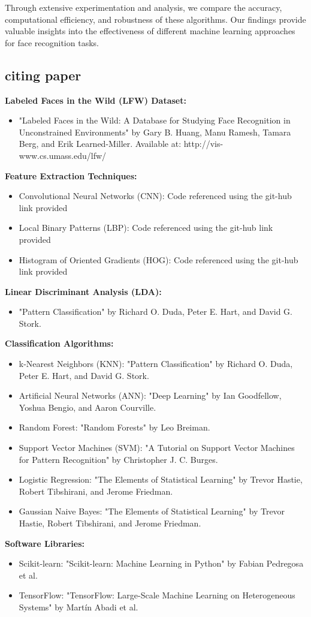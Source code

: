 \documentclass[a4paper]{article}
\theoremstyle{plain}
\theoremstyle{definition}
\begin{document}
Through extensive experimentation and analysis, we compare the accuracy, computational efficiency, and robustness of these algorithms. Our findings provide valuable insights into the effectiveness of different machine learning approaches for face recognition tasks.\vspace{8pt}
	
	\subsection{citing paper}
	\textbf{Labeled Faces in the Wild (LFW) Dataset:}
 
 \begin{itemize}
\item "Labeled Faces in the Wild: A Database for Studying Face Recognition in Unconstrained Environments" by Gary B. Huang, Manu Ramesh, Tamara Berg, and Erik Learned-Miller. Available at: http://vis-www.cs.umass.edu/lfw/  
\end{itemize}
\textbf{Feature Extraction Techniques:}
\begin{itemize}
\item Convolutional Neural Networks (CNN): Code referenced using the git-hub link provided
\item Local Binary Patterns (LBP): Code referenced using the git-hub link provided
\item Histogram of Oriented Gradients (HOG): Code referenced using the git-hub link provided
\end{itemize}
\textbf{Linear Discriminant Analysis (LDA):}
\begin{itemize}
\item "Pattern Classification" by Richard O. Duda, Peter E. Hart, and David G. Stork.
\end{itemize}
\textbf{Classification Algorithms:}
\begin{itemize}
\item k-Nearest Neighbors (KNN): "Pattern Classification" by Richard O. Duda, Peter E. Hart, and David G. Stork.
\item Artificial Neural Networks (ANN): "Deep Learning" by Ian Goodfellow, Yoshua Bengio, and Aaron Courville.
\item Random Forest: "Random Forests" by Leo Breiman.
\item Support Vector Machines (SVM): "A Tutorial on Support Vector Machines for Pattern Recognition" by Christopher J. C. Burges.
\item Logistic Regression: "The Elements of Statistical Learning" by Trevor Hastie, Robert Tibshirani, and Jerome Friedman.
\item Gaussian Naive Bayes: "The Elements of Statistical Learning" by Trevor Hastie, Robert Tibshirani, and Jerome Friedman.
\end{itemize}
\textbf{Software Libraries:}
\begin{itemize}
\item Scikit-learn: "Scikit-learn: Machine Learning in Python" by Fabian Pedregosa et al.
\item TensorFlow: "TensorFlow: Large-Scale Machine Learning on Heterogeneous Systems" by Martín Abadi et al.
\end{itemize}
\end{document}
